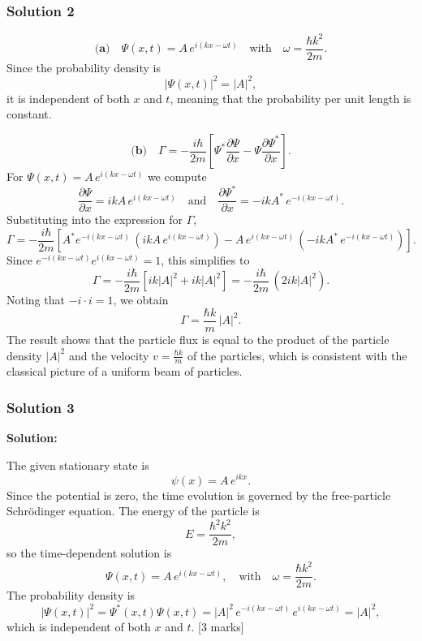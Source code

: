 \documentclass{article}
\begin{document}
\subsubsection{Solution 2}
\[
\textbf{(a)}\quad \Psi(x,t) = A\, e^{i(kx-\omega t)} \quad \text{with} \quad \omega=\frac{\hbar k^2}{2m}.
\]
Since the probability density is
\[
|\Psi(x,t)|^2 = |A|^2,
\]
it is independent of both \(x\) and \(t\), meaning that the probability per unit length is constant.

\[
\textbf{(b)}\quad \Gamma = -\frac{i \hbar}{2m} \left[ \Psi^* \frac{\partial \Psi}{\partial x} - \Psi \frac{\partial \Psi^*}{\partial x} \right].
\]
For \(\Psi(x,t) = A\, e^{i(kx-\omega t)}\) we compute
\[
\frac{\partial \Psi}{\partial x} = i k A\, e^{i(kx-\omega t)} \quad \text{and} \quad \frac{\partial \Psi^*}{\partial x} = -i k A^*\, e^{-i(kx-\omega t)}.
\]
Substituting into the expression for \(\Gamma\),
\[
\Gamma = -\frac{i \hbar}{2m}\left[ A^* e^{-i(kx-\omega t)} \, (i k A\, e^{i(kx-\omega t)}) - A\, e^{i(kx-\omega t)} \, (-i k A^*\, e^{-i(kx-\omega t)}) \right].
\]
Since \(e^{-i(kx-\omega t)}e^{i(kx-\omega t)} = 1\), this simplifies to
\[
\Gamma = -\frac{i \hbar}{2m}\left[ i k |A|^2 + i k |A|^2 \right] = -\frac{i \hbar}{2m}\, (2i k |A|^2).
\]
Noting that \(-i\cdot i = 1\), we obtain
\[
\Gamma = \frac{\hbar k}{m}\, |A|^2.
\]
The result shows that the particle flux is equal to the product of the particle density \(|A|^2\) and the velocity \(v=\frac{\hbar k}{m}\) of the particles, which is consistent with the classical picture of a uniform beam of particles.


\subsubsection{Solution 3}
\textbf{Solution:}

The given stationary state is 
\[
\psi(x) = A\, e^{ikx}.
\]
Since the potential is zero, the time evolution is governed by the free-particle Schrödinger equation. The energy of the particle is 
\[
E = \frac{\hbar^2 k^2}{2m},
\]
so the time-dependent solution is 
\[
\Psi(x,t) = A\, e^{i(kx - \omega t)}, \quad \text{with} \quad \omega = \frac{\hbar k^2}{2m}.
\]
The probability density is 
\[
|\Psi(x,t)|^2 = \Psi^*(x,t)\Psi(x,t) = |A|^2\, e^{-i(kx - \omega t)}\, e^{i(kx - \omega t)} = |A|^2,
\]
which is independent of both \(x\) and \(t\). \hfill [3 marks]
\end{document}
